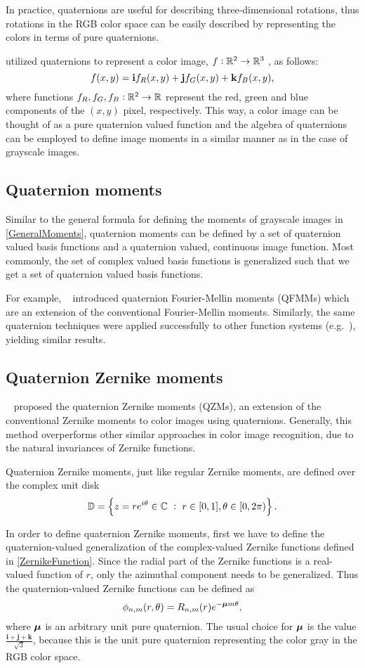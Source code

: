In practice, quaternions are useful for describing three-dimensional rotations, thus rotations in the RGB color space can be easily described by representing the colors in terms of pure quaternions.


\citeauthor{EllSangwine} \cite{EllSangwine} utilized quaternions to represent a color image, $f: \mathbb{R}^2\to\mathbb{R}^3$ , as follows:
\[
f(x,y) = \textbf{i} f_R(x,y) + \textbf{j} f_G(x,y) + \textbf{k} f_B(x,y),
\]
where functions $f_R , f_G, f_B:\mathbb{R}^2\to\mathbb{R}$ represent the red, green and blue components of the $(x,y)$ pixel, respectively. This way, a color image can be thought of as a pure quaternion valued function and the algebra of quaternions can be employed to define image moments in a similar manner as in the case of grayscale images.

\subsection{Quaternion moments}
Similar to the general formula for defining the moments of grayscale images in \eqref{GeneralMoments}, quaternion moments can be defined by a set of quaternion valued basis functions and a quaternion valued, continuous image function. Most commonly, the set of complex valued basis functions is generalized such that we get a set of quaternion valued basis functions.

For example, \citeauthor{qfmm}~\cite{qfmm} introduced quaternion Fourier-Mellin moments (QFMMs) which are an extension of the conventional Fourier-Mellin moments. Similarly, the same quaternion techniques were applied successfully to other function systems (e.g.~\cite{Shao, chebyshev-fourier}), yielding similar results.

\subsection{Quaternion Zernike moments}\label{sec:qzm}
\citeauthor{qzm}~\cite{qzm,qzmi} proposed the quaternion Zernike moments (QZMs), an extension of the conventional Zernike moments to color images using quaternions. Generally, this method overperforms other similar approaches in color image recognition, due to the natural invariances of Zernike functions.


Quaternion Zernike moments, just like regular Zernike moments, are defined over the complex unit disk
\[
	\D = \left\{ z = re^{i\theta}\in\C \ :\ r\in[0,1],\theta\in[0,2\pi)\right\}.
\]


In order to define quaternion Zernike moments, first we have to define the quaternion-valued generalization of the complex-valued Zernike functions defined in \eqref{ZernikeFunction}. Since the radial part of the Zernike functions is a real-valued function of $r$, only the azimuthal component needs to be generalized. Thus the quaternion-valued Zernike functions can be defined as
\[
	\phi_{n,m}(r,\theta) = R_{n,m}(r) e^{-\boldsymbol{\mu} m\theta},
\]
where $\boldsymbol{\mu}$ is an arbitrary unit pure quaternion. The usual choice for $\boldsymbol{\mu}$ is the value $\frac{\mathbf{i} + \mathbf{j} + \mathbf{k}}{\sqrt{3}}$, because this is the unit pure quaternion representing the color gray in the RGB color space.

